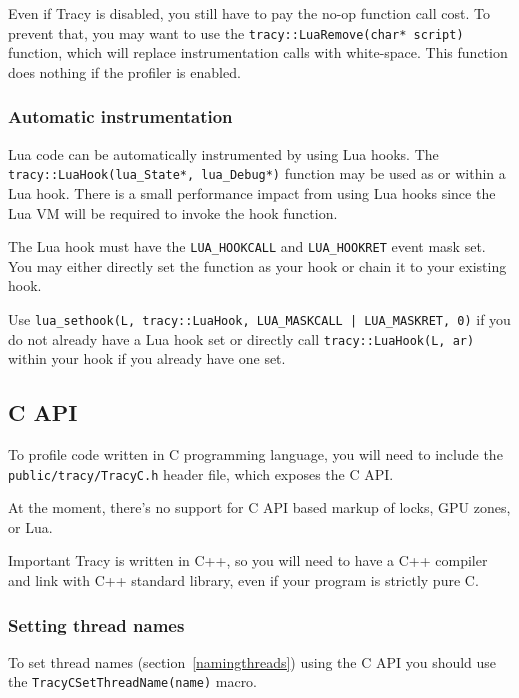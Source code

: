 \documentclass[hidelinks,titlepage,a4paper,twoside]{article}
\begin{document}
Even if Tracy is disabled, you still have to pay the no-op function call cost. To prevent that, you may want to use the \texttt{tracy::LuaRemove(char* script)} function, which will replace instrumentation calls with white-space. This function does nothing if the profiler is enabled.

\subsubsection{Automatic instrumentation}

Lua code can be automatically instrumented by using Lua hooks. The \texttt{tracy::LuaHook(lua\_State*, lua\_Debug*)} function may be used as or within a Lua hook. There is a small performance impact from using Lua hooks since the Lua VM will be required to invoke the hook function.

The Lua hook must have the \texttt{LUA\_HOOKCALL} and \texttt{LUA\_HOOKRET} event mask set. You may either directly set the function as your hook or chain it to your existing hook.

Use \texttt{lua\_sethook(L, tracy::LuaHook, LUA\_MASKCALL | LUA\_MASKRET, 0)} if you do not already have a Lua hook set or directly call \texttt{tracy::LuaHook(L, ar)} within your hook if you already have one set.

\subsection{C API}
\label{capi}

To profile code written in C programming language, you will need to include the \texttt{public/tracy/TracyC.h} header file, which exposes the C API.

At the moment, there's no support for C API based markup of locks, GPU zones, or Lua.

\begin{bclogo}[
noborder=true,
couleur=black!5,
logo=\bcbombe
]{Important}
Tracy is written in C++, so you will need to have a C++ compiler and link with C++ standard library, even if your program is strictly pure C.
\end{bclogo}

\subsubsection{Setting thread names}

To set thread names (section~\ref{namingthreads}) using the C API you should use the \texttt{TracyCSetThreadName(name)} macro.
\end{document}
